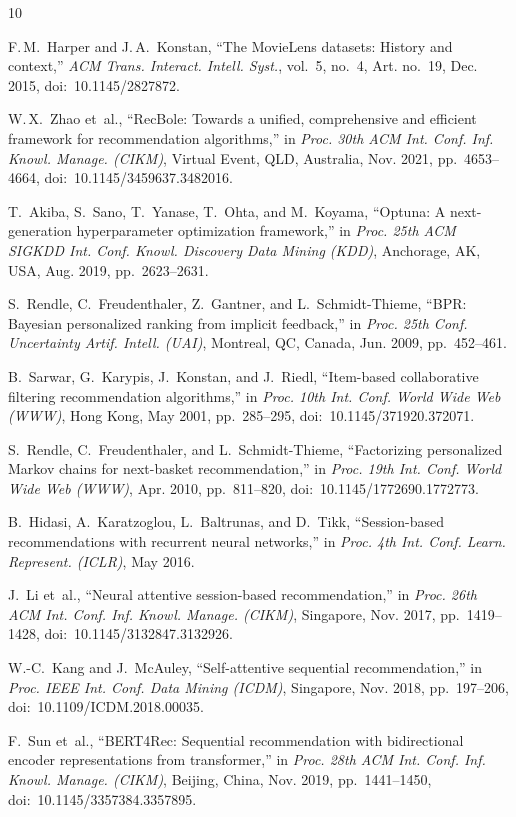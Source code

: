 \documentclass[12pt,a4paper]{article}
\begin{document}
\newpage
\begin{thebibliography}{10}

F.\,M.~Harper and J.\,A.~Konstan,
``The MovieLens datasets: History and context,''
\textit{ACM Trans. Interact. Intell. Syst.},
vol.~5, no.~4, Art. no.~19, Dec. 2015,
doi:~10.1145/2827872.

W.\,X.~Zhao et~al.,
``RecBole: Towards a unified, comprehensive and efficient framework
for recommendation algorithms,''
in \textit{Proc. 30th ACM Int. Conf. Inf. Knowl. Manage. (CIKM)},
Virtual Event, QLD, Australia, Nov. 2021, pp.~4653--4664,
doi:~10.1145/3459637.3482016.

T.~Akiba, S.~Sano, T.~Yanase, T.~Ohta, and M.~Koyama,
``Optuna: A next-generation hyperparameter optimization framework,''
in \textit{Proc. 25th ACM SIGKDD Int. Conf. Knowl. Discovery Data Mining (KDD)},
Anchorage, AK, USA, Aug. 2019, pp.~2623--2631.

S.~Rendle, C.~Freudenthaler, Z.~Gantner, and L.~Schmidt-Thieme,
``BPR: Bayesian personalized ranking from implicit feedback,''
in \textit{Proc. 25th Conf. Uncertainty Artif. Intell. (UAI)},
Montreal, QC, Canada, Jun. 2009, pp.~452--461.

B.~Sarwar, G.~Karypis, J.~Konstan, and J.~Riedl,
``Item-based collaborative filtering recommendation algorithms,''
in \textit{Proc. 10th Int. Conf. World Wide Web (WWW)},
Hong Kong, May 2001, pp.~285--295,
doi:~10.1145/371920.372071.

S.~Rendle, C.~Freudenthaler, and L.~Schmidt-Thieme,
``Factorizing personalized Markov chains for next-basket recommendation,''
in \textit{Proc. 19th Int. Conf. World Wide Web (WWW)},
Apr. 2010, pp.~811--820,
doi:~10.1145/1772690.1772773.

B.~Hidasi, A.~Karatzoglou, L.~Baltrunas, and D.~Tikk,
``Session-based recommendations with recurrent neural networks,''
in \textit{Proc. 4th Int. Conf. Learn. Represent. (ICLR)},
May 2016.

J.~Li et~al.,
``Neural attentive session-based recommendation,''
in \textit{Proc. 26th ACM Int. Conf. Inf. Knowl. Manage. (CIKM)},
Singapore, Nov. 2017, pp.~1419--1428,
doi:~10.1145/3132847.3132926.

W.-C.~Kang and J.~McAuley,
``Self-attentive sequential recommendation,''
in \textit{Proc. IEEE Int. Conf. Data Mining (ICDM)},
Singapore, Nov. 2018, pp.~197--206,
doi:~10.1109/ICDM.2018.00035.

F.~Sun et~al.,
``BERT4Rec: Sequential recommendation with bidirectional encoder
representations from transformer,''
in \textit{Proc. 28th ACM Int. Conf. Inf. Knowl. Manage. (CIKM)},
Beijing, China, Nov. 2019, pp.~1441--1450,
doi:~10.1145/3357384.3357895.

\end{thebibliography}
\end{document}

